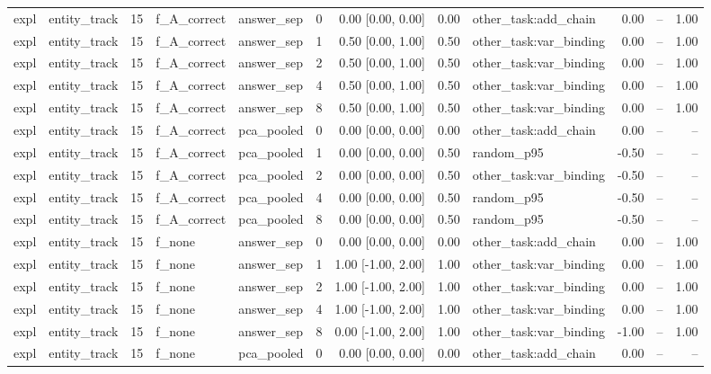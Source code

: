 \begin{tabular}{llrllrrrlrrr}
expl & entity\_track & 15 & f\_A\_correct & answer\_sep & 0 & 0.00 [0.00, 0.00] & 0.00 & other\_task:add\_chain & 0.00 & -- & 1.00 \\
expl & entity\_track & 15 & f\_A\_correct & answer\_sep & 1 & 0.50 [0.00, 1.00] & 0.50 & other\_task:var\_binding & 0.00 & -- & 1.00 \\
expl & entity\_track & 15 & f\_A\_correct & answer\_sep & 2 & 0.50 [0.00, 1.00] & 0.50 & other\_task:var\_binding & 0.00 & -- & 1.00 \\
expl & entity\_track & 15 & f\_A\_correct & answer\_sep & 4 & 0.50 [0.00, 1.00] & 0.50 & other\_task:var\_binding & 0.00 & -- & 1.00 \\
expl & entity\_track & 15 & f\_A\_correct & answer\_sep & 8 & 0.50 [0.00, 1.00] & 0.50 & other\_task:var\_binding & 0.00 & -- & 1.00 \\
expl & entity\_track & 15 & f\_A\_correct & pca\_pooled & 0 & 0.00 [0.00, 0.00] & 0.00 & other\_task:add\_chain & 0.00 & -- & -- \\
expl & entity\_track & 15 & f\_A\_correct & pca\_pooled & 1 & 0.00 [0.00, 0.00] & 0.50 & random\_p95 & -0.50 & -- & -- \\
expl & entity\_track & 15 & f\_A\_correct & pca\_pooled & 2 & 0.00 [0.00, 0.00] & 0.50 & other\_task:var\_binding & -0.50 & -- & -- \\
expl & entity\_track & 15 & f\_A\_correct & pca\_pooled & 4 & 0.00 [0.00, 0.00] & 0.50 & random\_p95 & -0.50 & -- & -- \\
expl & entity\_track & 15 & f\_A\_correct & pca\_pooled & 8 & 0.00 [0.00, 0.00] & 0.50 & random\_p95 & -0.50 & -- & -- \\
expl & entity\_track & 15 & f\_none & answer\_sep & 0 & 0.00 [0.00, 0.00] & 0.00 & other\_task:add\_chain & 0.00 & -- & 1.00 \\
expl & entity\_track & 15 & f\_none & answer\_sep & 1 & 1.00 [-1.00, 2.00] & 1.00 & other\_task:var\_binding & 0.00 & -- & 1.00 \\
expl & entity\_track & 15 & f\_none & answer\_sep & 2 & 1.00 [-1.00, 2.00] & 1.00 & other\_task:var\_binding & 0.00 & -- & 1.00 \\
expl & entity\_track & 15 & f\_none & answer\_sep & 4 & 1.00 [-1.00, 2.00] & 1.00 & other\_task:var\_binding & 0.00 & -- & 1.00 \\
expl & entity\_track & 15 & f\_none & answer\_sep & 8 & 0.00 [-1.00, 2.00] & 1.00 & other\_task:var\_binding & -1.00 & -- & 1.00 \\
expl & entity\_track & 15 & f\_none & pca\_pooled & 0 & 0.00 [0.00, 0.00] & 0.00 & other\_task:add\_chain & 0.00 & -- & -- \\

\end{tabular}

